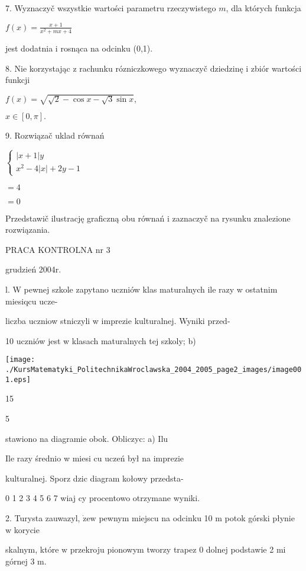 \documentclass[a4paper,12pt]{article}
\begin{document}
7. Wyznaczyč wszystkie wartości parametru rzeczywistego $m$, dla których funkcja

$f(x)=\displaystyle \frac{x+1}{x^{2}+mx+4}$

jest dodatnia i rosnąca na odcinku (0,1).

8. Nie korzystając z rachunku rózniczkowego wyznaczyč dziedzinę i zbiór wartości funkcji

$f(x)=\sqrt{\sqrt{2}-\cos x-\sqrt{3}\sin x},$

$x\in[0,\pi].$

9. Rozwiązač uklad równań

$\left\{\begin{array}{l}
|x+1|y\\
x^{2}-4|x|+2y-1
\end{array}\right.$

$=4$

$=0$

Przedstawič ilustrację graficzną obu równań i zaznaczyč na rysunku znalezione rozwiązania.





PRACA KONTROLNA nr 3

grudzień 2004r.

l. W pewnej szkole zapytano uczniów klas maturalnych ile razy w ostatnim miesiqcu ucze-

liczba uczniow stniczyli w imprezie kulturalnej. Wyniki przed-

10 uczniów jest w klasach maturalnych tej szkoly; b)
\begin{center}
\texttt{[image: ./KursMatematyki\_PolitechnikaWroclawska\_2004\_2005\_page2\_images/image001.eps]}
\end{center}
15

5

stawiono na diagramie obok. Obliczyc: a) Ilu

Ile razy średnio w miesi cu uczeń był na imprezie

kulturalnej. Sporz dzic diagram kołowy przedsta-

0 1 2 3 4 5 6 7 wiaj cy procentowo otrzymane wyniki.

2. Turysta zauwazyl, $\dot{\mathrm{z}}\mathrm{e}\mathrm{w}$ pewnym miejscu na odcinku 10 $\mathrm{m}$ potok górski płynie $\mathrm{w}$ korycie

skalnym, które $\mathrm{w}$ przekroju pionowym tworzy trapez $0$ dolnej podstawie 2 $\mathrm{m}\mathrm{i}$ górnej 3 $\mathrm{m}.$
\end{document}

